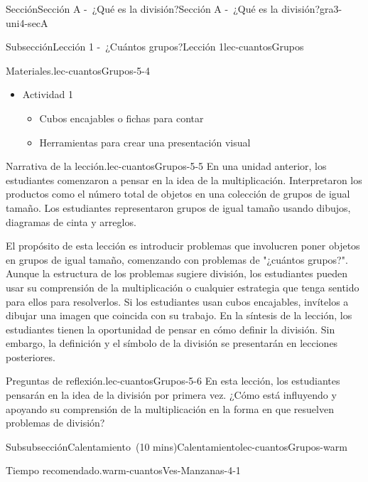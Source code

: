 \documentclass[oneside,10pt,]{article}
\begin{document}
\begin{sectionptx}{Sección}{Sección A -~¿Qué es la división?}{}{Sección A -~¿Qué es la división?}{}{}{gra3-uni4-secA}
\begin{subsectionptx}{Subsección}{Lección 1 -~¿Cuántos grupos?}{}{Lección 1}{}{}{lec-cuantosGrupos}
\begin{introduction}{}
\begin{paragraphs}{Materiales.}{lec-cuantosGrupos-5-4}
%
\begin{itemize}[label=\textbullet]
\item{}Actividad 1%
%
\begin{itemize}[label=$\circ$]
\item{}Cubos encajables o fichas para contar%
\item{}Herramientas para crear una presentación visual%
\end{itemize}
\end{itemize}
\end{paragraphs}%
\begin{paragraphs}{Narrativa de la lección.}{lec-cuantosGrupos-5-5}%
En una unidad anterior, los estudiantes comenzaron a pensar en la idea de la multiplicación. Interpretaron los productos como el número total de objetos en una colección de grupos de igual tamaño. Los estudiantes representaron grupos de igual tamaño usando dibujos, diagramas de cinta y arreglos.%
\par
El propósito de esta lección es introducir problemas que involucren poner objetos en grupos de igual tamaño, comenzando con problemas de "¿cuántos grupos?". Aunque la estructura de los problemas sugiere división, los estudiantes pueden usar su comprensión de la multiplicación o cualquier estrategia que tenga sentido para ellos para resolverlos. Si los estudiantes usan cubos encajables, invítelos a dibujar una imagen que coincida con su trabajo. En la síntesis de la lección, los estudiantes tienen la oportunidad de pensar en cómo definir la división. Sin embargo, la definición y el símbolo de la división se presentarán en lecciones posteriores.%
\end{paragraphs}%
\begin{paragraphs}{Preguntas de reflexión.}{lec-cuantosGrupos-5-6}%
En esta lección, los estudiantes pensarán en la idea de la división por primera vez. ¿Cómo está influyendo y apoyando su comprensión de la multiplicación en la forma en que resuelven problemas de división?%
\end{paragraphs}%
\end{introduction}%
%
%
\typeout{************************************************}
\typeout{************************************************}
%
\begin{subsubsectionptx}{Subsubsección}{Calentamiento~(10 mins)}{}{Calentamiento}{}{}{lec-cuantosGrupos-warm}
\par
\begin{paragraphs}{Tiempo recomendado.}{warm-cuantosVes-Manzanas-4-1}%

\end{paragraphs}
\end{subsubsectionptx}
\end{subsectionptx}
\end{sectionptx}
\end{document}
